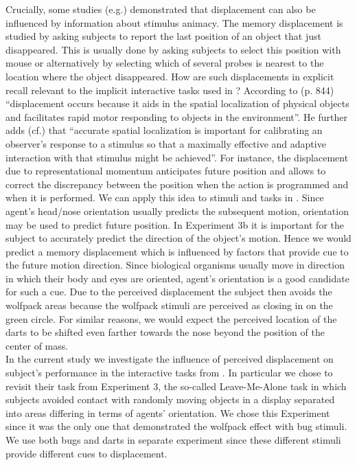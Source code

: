 \documentclass[10pt]{article}
\begin{document}
Crucially, some studies (e.g.\cite{freyd92}) demonstrated that displacement can also be influenced by information about stimulus animacy. 
The memory displacement is studied by asking subjects to report the last position of an object that just disappeared.
This is usually done by asking subjects to select this position with mouse or alternatively by selecting which of several probes is nearest to the location where the object disappeared.
How are such displacements in explicit recall relevant to the implicit interactive tasks used in \cite{gao10}?
According to \cite{hubbard05} (p. 844) ``displacement occurs because it aids in the spatial localization of physical objects and facilitates rapid motor responding to objects in the environment''. 
He further adds (cf.) that ``accurate spatial localization is important for calibrating an observer's response to a stimulus so that a maximally effective and adaptive interaction with that stimulus might be achieved''. 
For instance, the displacement due to representational momentum anticipates future position and allows to correct the discrepancy between the position when the action is programmed and when it is performed. 
We can apply this idea to stimuli and tasks in \cite{gao10}. Since agent's head/nose orientation usually predicts the subsequent motion, orientation may be used to predict future position. 
In Experiment 3b it is important for the subject to accurately predict the direction of the object's motion. 
Hence we would predict a memory displacement which is influenced by factors that provide cue to the future motion direction. 
Since biological organisms usually move in direction in which their body and eyes are oriented, agent's orientation is a good candidate for such a cue.  
Due to the perceived displacement the subject then avoids the wolfpack areas because the wolfpack stimuli are perceived as closing in on the green circle. 
For similar reasons, we would expect the perceived location of the darts to be shifted even farther towards the nose beyond the position of the center of mass.\\
In the current study we investigate the influence of perceived displacement on subject's performance in the interactive tasks from \cite{gao10}. 
In particular we chose to revisit their task from Experiment 3, the so-called Leave-Me-Alone task in which subjects avoided contact with randomly moving objects in a display separated into areas differing in terms of agents' orientation. 
We chose this Experiment since it was the only one that demonstrated the wolfpack effect with bug stimuli. We use both bugs and darts in separate experiment since these different stimuli provide different cues to displacement.\\
\end{document}
